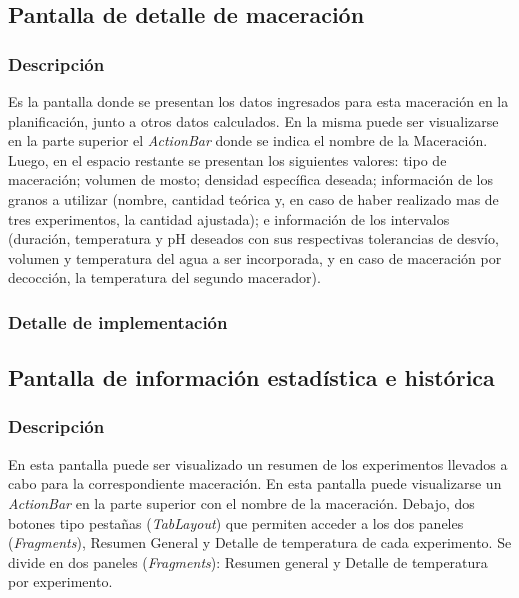         \subsection{Pantalla de detalle de maceración}
            \subsubsection{Descripción}
            Es la pantalla donde se presentan los datos ingresados para esta maceración en la planificación, junto a otros datos calculados.
            En la misma puede ser visualizarse en la parte superior el \textit{ActionBar} donde se indica el nombre de la Maceración. Luego, en el espacio restante se presentan los siguientes valores: tipo de maceración; volumen de mosto; densidad específica deseada; información de los granos a utilizar (nombre, cantidad teórica y, en caso de haber realizado mas de tres experimentos, la cantidad ajustada); e información de los intervalos (duración, temperatura y pH deseados con sus respectivas tolerancias de desvío, volumen y temperatura del agua a ser incorporada, y en caso de maceración por decocción, la temperatura del segundo macerador).
            
            \subsubsection{Detalle de implementación}
            
        \subsection{Pantalla de información estadística e histórica}
            \subsubsection{Descripción}
            En esta pantalla puede ser visualizado un resumen de los experimentos llevados a cabo para la correspondiente maceración.
            En esta pantalla puede visualizarse un \textit{ActionBar} en la parte superior con el nombre de la maceración. Debajo, dos botones tipo pestañas (\textit{TabLayout}) que permiten acceder a los dos paneles (\textit{Fragments}), Resumen General y Detalle de temperatura de cada experimento. 
            Se divide en dos paneles (\textit{Fragments}): Resumen general y Detalle de temperatura por experimento.
            
